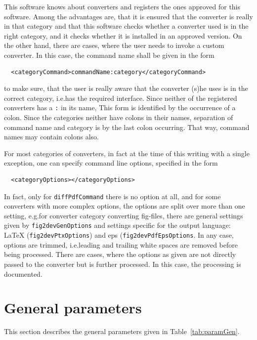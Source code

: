 This software knows about converters and registers the ones approved for this software. 
Among the advantages are, that it is ensured that the converter is really in that category 
and that this software checks whether a converter used is in the right category, 
and it checks whether it is installed in an approved version. 
On the other hand, there are cases, where the user needs to invoke a custom converter. 
In this case, the command name shall be given in the form 
%
\begin{verbatim}
  <categoryCommand>commandName:category</categoryCommand>
\end{verbatim}
%
to make sure, that the user is really aware that the converter (s)he uses %
is in the correct category, i.e.\@ has the required interface. 
Since neither of the registered converters has a \texttt{:} in its name, 
This form is identified by the occurrence of a colon. 
Since the categories neither have colons in their names, 
separation of command name and category is by the last colon occurring. 
That way, command names may contain colons also. 

For most categories of converters, in fact at the time of this writing with a single exception, 
one can specify command line options, specified in the form 
%
\begin{verbatim}
  <categoryOptions></categoryOptions>
\end{verbatim}
%
In fact, only for \texttt{diffPdfCommand} there is no option at all, 
and for some converters with more complex options, 
the options are split over more than one setting, 
e.g.\@ for converter category  converting \gls{fig}-files, 
there are general settings given by \texttt{fig2devGenOptions}
and settings specific for the output language: 
\LaTeX{} (\texttt{fig2devPtxOptions}) 
and \gls{eps} (\texttt{fig2devPdfEpsOptions}. 
In any case, options are trimmed, 
i.e.\@ leading and trailing white spaces are removed 
before being processed. 
There are cases, 
where the options as given are not directly passed to the converter 
but is further processed. 
In this case, the processing is documented. 





\section{General parameters }\label{sec:settingsGen}

This section describes the general parameters given in Table~\ref{tab:paramGen}. 


